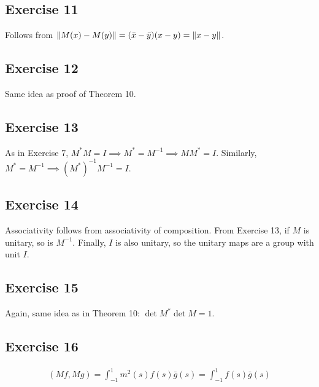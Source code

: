\subsection{Exercise 11}
Follows from $\norm{M(x) - M(y)} = (\bar{x} - \bar{y}) (x - y) = \norm{x - y}$.

\subsection{Exercise 12}
Same idea as proof of Theorem 10.

\subsection{Exercise 13}
As in Exercise 7, $M^{*} M = I \implies M^{*} = M^{-1} \implies M M^{*} = I$. Similarly,
$M^{*} = M^{-1} \implies (M^{*})^{-1} M^{-1} = I$.

\subsection{Exercise 14}
Associativity follows from associativity of composition. From Exercise 13, if $M$ is unitary, so is $M^{-1}$.
Finally, $I$ is also unitary, so the unitary maps are a group with unit $I$.

\subsection{Exercise 15}
Again, same idea as in Theorem 10: $\det M^{*} \det M = 1$.

\subsection{Exercise 16}
\begin{align*}
        (Mf, Mg) = \int_{-1}^{1} m^2(s) f(s) \bar{g}(s) = \int_{-1}^{1} f(s) \bar{g}(s)
\end{align*}

